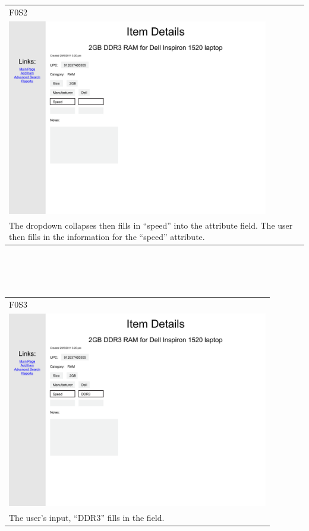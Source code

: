 \documentclass{article}
\begin{document}
~\\
~\\
\begin{tabular}{ p{4.5in} }
F0S2\\
\includegraphics[keepaspectratio, width=4.5in]{modifyDetailsF0S2.pdf} \\
The dropdown collapses then fills in ``speed'' into the attribute field. The user then fills in the information for the ``speed'' attribute.
\end{tabular}\\
~\\
~\\
\begin{tabular}{ p{4.5in} }
F0S3\\
\includegraphics[keepaspectratio, width=4.5in]{modifyDetailsF0S3.pdf} \\
The user's input, ``DDR3'' fills in the field.
\end{tabular}\\
\end{document}
